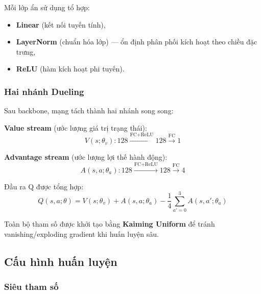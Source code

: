 Mỗi lớp ẩn sử dụng tổ hợp:
\begin{itemize}
    \item \textbf{Linear} (kết nối tuyến tính),
    \item \textbf{LayerNorm} (chuẩn hóa lớp) --- ổn định phân phối kích hoạt theo chiều đặc trưng,
    \item \textbf{ReLU} (hàm kích hoạt phi tuyến).
\end{itemize}

\subsubsection{Hai nhánh Dueling}

Sau backbone, mạng tách thành hai nhánh song song:

\textbf{Value stream} (ước lượng giá trị trạng thái):
\[
V(s;\theta_v): 128 \xrightarrow{\text{FC}+\text{ReLU}} 128 \xrightarrow{\text{FC}} 1
\]

\textbf{Advantage stream} (ước lượng lợi thế hành động):
\[
A(s,a;\theta_a): 128 \xrightarrow{\text{FC}+\text{ReLU}} 128 \xrightarrow{\text{FC}} 4
\]

Đầu ra Q được tổng hợp:
\[
Q(s, a;\theta) = V(s;\theta_v) + A(s, a;\theta_a) - \frac{1}{4}\sum_{a'=0}^{3} A(s, a';\theta_a)
\]

Toàn bộ tham số được khởi tạo bằng \textbf{Kaiming Uniform} để tránh vanishing/exploding gradient khi huấn luyện sâu.

\subsection{Cấu hình huấn luyện}

\subsubsection{Siêu tham số}

